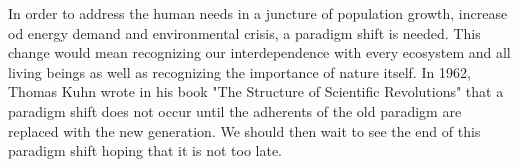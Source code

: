 In order to address the human needs in a juncture of population growth, increase od energy demand and environmental crisis, a paradigm shift is needed. This change would mean recognizing our interdependence with every ecosystem and all living beings as well as recognizing the importance of nature itself. In 1962, Thomas Kuhn wrote in his book  "The Structure of Scientific Revolutions" that a paradigm shift does not occur until the adherents of the old paradigm are replaced with the new generation. We should then wait to see the end of this paradigm shift hoping that it is not too late. 








